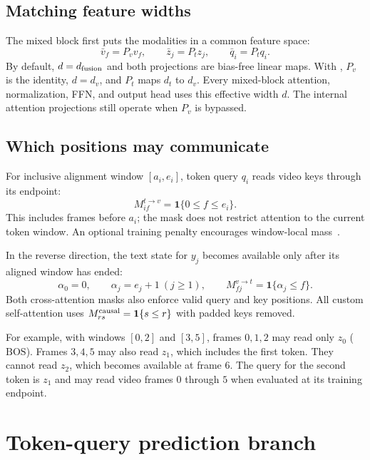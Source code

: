 \documentclass[11pt,a4paper]{article}
\newcommand{\BOS}{\ensuremath{\mathrm{BOS}}}
\newcommand{\code}[1]{\texttt{\detokenize{#1}}}
\numberwithin{equation}{section}
\begin{document}
\subsection{Matching feature widths}

The mixed block first puts the modalities in a common feature space:
\begin{equation}
\bar v_f=P_vv_f,\qquad \bar z_j=P_tz_j,\qquad \bar q_i=P_tq_i.
\end{equation}
By default, $d=d_{\rm fusion}$ and both projections are bias-free
linear maps. With \code{--no-vproj}, $P_v$ is the identity,
$d=d_v$, and $P_t$ maps $d_t$ to $d_v$. Every mixed-block attention,
normalization, FFN, and output head uses this effective width $d$.
The internal attention projections still operate when $P_v$ is bypassed.

\subsection{Which positions may communicate}

For inclusive alignment window $[a_i,e_i]$, token query $q_i$ reads
video keys through its endpoint:
\begin{equation}
M^{t\to v}_{if}=\mathbf1\{0\leq f\leq e_i\}.
\label{eq:t2v}
\end{equation}
This includes frames before $a_i$; the mask does not restrict attention
to the current token window. An optional training penalty encourages
window-local mass~\cite{training}.

In the reverse direction, the text state for $y_j$ becomes available
only after its aligned window has ended:
\begin{equation}
\alpha_0=0,\qquad \alpha_j=e_j+1\ (j\geq1),\qquad
M^{v\to t}_{fj}=\mathbf1\{\alpha_j\leq f\}.
\label{eq:v2t}
\end{equation}
Both cross-attention masks also enforce valid query and key positions.
All custom self-attention uses $M^{\rm causal}_{rs}=\mathbf1\{s\leq r\}$
with padded keys removed.

For example, with windows $[0,2]$ and $[3,5]$, frames $0,1,2$ may read
only $z_0$ (\BOS). Frames $3,4,5$ may also read $z_1$, which includes
the first token. They cannot read $z_2$, which becomes available at
frame $6$. The query for the second token is $z_1$ and may read video
frames $0$ through $5$ when evaluated at its training endpoint.

\section{Token-query prediction branch}
\label{sec:token}
\end{document}

